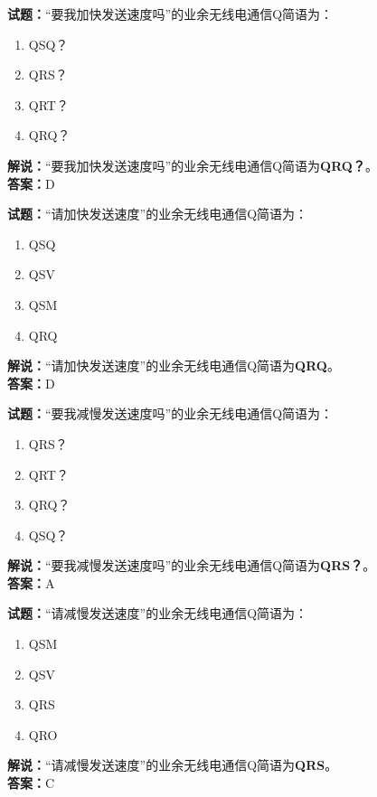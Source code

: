 \documentclass{ctexbook}
\begin{document}
\bigskip


\noindent\textbf{试题：}“要我加快发送速度吗”的业余无线电通信Q简语为：
\begin{enumerate}[leftmargin=3em]
\item QSQ？
\item QRS？
\item QRT？
\item QRQ？
\end{enumerate}
\noindent\textbf{解说：}“要我加快发送速度吗”的业余无线电通信Q简语为\textbf{QRQ？}。\\\noindent\textbf{答案：}D



\bigskip


\noindent\textbf{试题：}“请加快发送速度”的业余无线电通信Q简语为：
\begin{enumerate}[leftmargin=3em]
\item QSQ
\item QSV
\item QSM
\item QRQ
\end{enumerate}
\noindent\textbf{解说：}“请加快发送速度”的业余无线电通信Q简语为\textbf{QRQ}。\\\noindent\textbf{答案：}D



\bigskip


\noindent\textbf{试题：}“要我减慢发送速度吗”的业余无线电通信Q简语为：
\begin{enumerate}[leftmargin=3em]
\item QRS？
\item QRT？
\item QRQ？
\item QSQ？
\end{enumerate}
\noindent\textbf{解说：}“要我减慢发送速度吗”的业余无线电通信Q简语为\textbf{QRS？}。\\\noindent\textbf{答案：}A




\bigskip


\noindent\textbf{试题：}“请减慢发送速度”的业余无线电通信Q简语为：
\begin{enumerate}[leftmargin=3em]
\item QSM
\item QSV
\item QRS
\item QRO
\end{enumerate}
\noindent\textbf{解说：}“请减慢发送速度”的业余无线电通信Q简语为\textbf{QRS}。\\\noindent\textbf{答案：}C
\end{document}
